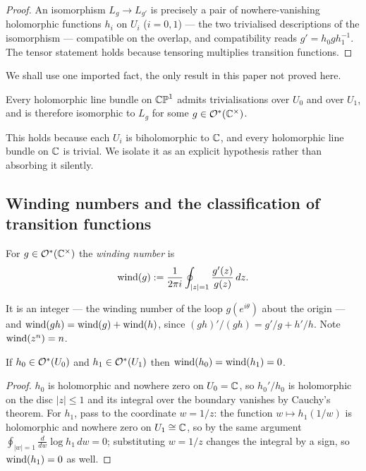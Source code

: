 \begin{proof}
An isomorphism $L_g \to L_{g'}$ is precisely a pair of nowhere-vanishing
holomorphic functions $h_i$ on $U_i$ ($i = 0,1$) --- the two trivialised
descriptions of the isomorphism --- compatible on the overlap, and compatibility
reads $g' = h_0 g h_1^{-1}$. The tensor statement holds because tensoring
multiplies transition functions.
\end{proof}

We shall use one imported fact, the only result in this paper not proved here.

\begin{fact}\label{fact:trivialise}
Every holomorphic line bundle on $\mathbb{CP}^1$ admits trivialisations over $U_0$ and over
$U_1$, and is therefore isomorphic to $L_g$ for some
$g \in \mathcal{O}^\ast(\mathbb{C}^\times)$.
\end{fact}

This holds because each $U_i$ is biholomorphic to $\mathbb{C}$, and every holomorphic
line bundle on $\mathbb{C}$ is trivial. We isolate it as an explicit hypothesis rather
than absorbing it silently.

\subsection{Winding numbers and the classification of transition functions}

\begin{definition}
For $g \in \mathcal{O}^\ast(\mathbb{C}^\times)$ the \emph{winding number} is
\[
\operatorname{wind}(g) := \frac{1}{2\pi i}\oint_{|z|=1} \frac{g'(z)}{g(z)}\,dz .
\]
\end{definition}

It is an integer --- the winding number of the loop $g(e^{i\theta})$ about the
origin --- and $\operatorname{wind}(gh) = \operatorname{wind}(g) + \operatorname{wind}(h)$, since $(gh)'/(gh) = g'/g +
h'/h$. Note $\operatorname{wind}(z^n) = n$.

\begin{smjlemma}\label{lem:windcoboundary}
If $h_0 \in \mathcal{O}^\ast(U_0)$ and $h_1 \in \mathcal{O}^\ast(U_1)$ then
$\operatorname{wind}(h_0) = \operatorname{wind}(h_1) = 0$.
\end{smjlemma}

\begin{proof}
$h_0$ is holomorphic and nowhere zero on $U_0 = \mathbb{C}$, so $h_0'/h_0$ is
holomorphic on the disc $|z| \leq 1$ and its integral over the boundary vanishes
by Cauchy's theorem. For $h_1$, pass to the coordinate $w = 1/z$: the function
$w \mapsto h_1(1/w)$ is holomorphic and nowhere zero on $U_1 \cong \mathbb{C}$, so by the
same argument $\oint_{|w|=1}\frac{d}{dw}\log h_1 \,dw = 0$; substituting
$w = 1/z$ changes the integral by a sign, so $\operatorname{wind}(h_1) = 0$ as well.
\end{proof}

